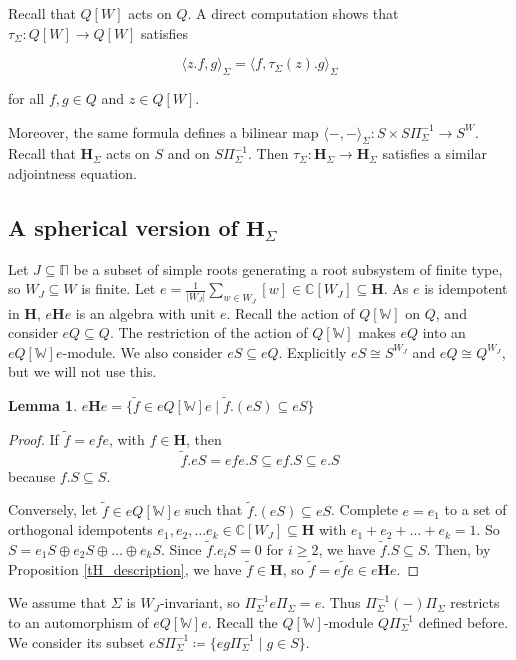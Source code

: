 \documentclass[11pt]{article}
\newcommand{\C}{\mathbb{C}}
\renewcommand{\H}{\textbf{H}}
\newcommand{\1}{\mathbb{1}}
\newcommand{\tW}{\mathbb{W}}
\newcommand{\tf}{\widetilde{f}}
\renewcommand{\subset}{\subseteq}
\newtheorem{lemma}[theorem]{Lemma}
\theoremstyle{definition}
\numberwithin{equation}{section}
\begin{document}
\noindent Recall that $Q[W]$ acts on $Q$. A direct computation shows that $\tau_\Sigma : Q[W] \rightarrow Q[W]$ satisfies

$$\langle z.f, g \rangle_\Sigma = \langle f, \tau_\Sigma(z).g\rangle_{\Sigma}$$

\noindent for all $f,g\in Q$ and $z\in Q[W]$.

\noindent Moreover, the same formula defines a bilinear map $\langle - , -\rangle_\Sigma : S \times S\Pi_{\Sigma}^{-1} \rightarrow S^W$. Recall that $\H_\Sigma$ acts on $S$ and on $S \Pi_\Sigma^{-1}$. Then $\tau_\Sigma : \H_\Sigma \rightarrow \H_\Sigma$ satisfies a similar adjointness equation. 


\subsection*{A spherical version of $\H_\Sigma$}

Let $J\subset \mathbb{\Pi}$ be a subset of simple roots generating a root subsystem of finite type, so $W_J \subset W$ is finite. Let $e = \frac{1}{|W_J|} \sum_{w\in W_J} [w] \in \C[W_J] \subset \H$. As $e$ is idempotent in $\H$, $e\H e$ is an algebra with unit $e$. Recall the action of $Q[\tW]$ on $Q$, and consider $eQ \subset Q$. The restriction of the action of $Q[\tW]$ makes $eQ$ into an $e Q[\tW] e$-module. We also consider $eS \subset eQ$. Explicitly $eS\cong S^{W_J}$ and $eQ \cong Q^{W_J}$, but we will not use this.

\begin{lemma}
\label{tHsph_description}
    $e \H e = \{ \tf \in e Q[\tW] e \mid \tf.(eS) \subset eS\}$
\end{lemma}

\begin{proof}
    If $\tf = efe$, with $f\in \H$, then
    $$\tf .eS = efe.S \subset ef.S \subset e.S$$
    because $f.S\subset S$.
    
    Conversely, let $\tf \in e Q[\tW]e$ such that $\tf.(eS) \subset eS$.
    Complete $e=e_1$ to a set of orthogonal idempotents $e_1, e_2, \ldots e_k \in \C[W_J] \subset \H$ with $e_1 + e_2 + \ldots + e_k = 1 $. So $S = e_1S \oplus e_2S \oplus \ldots \oplus e_k S$. Since $\tf. e_i S =0$ for $i \geq 2$, we have $\tf . S \subset S$. Then, by Proposition \ref{tH_description}, we have $\tf \in \H$, so $\tf = e \tf e \in e\H e$.
\end{proof}

We assume that $\Sigma$ is $W_J$-invariant, so $\Pi_{\Sigma}^{-1} e \Pi_\Sigma = e$. Thus $\Pi_\Sigma^{-1} (-) \Pi_\Sigma$ restricts to an automorphism of $e Q[\tW] e$. Recall the $Q[\tW]$-module $Q \Pi_\Sigma^{-1}$ defined before. We consider its subset $eS \Pi_\Sigma^{-1} \coloneqq \{ e g \Pi_\Sigma^{-1} \mid g \in S\}$.
\end{document}
